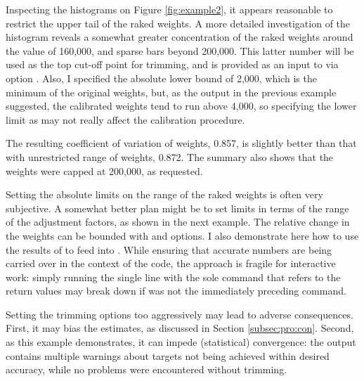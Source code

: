 \begin{stexample}[Example 3]

Inspecting the histograms on Figure \ref{fig:example2}, it appears reasonable
to restrict the upper tail of the raked weights. A more detailed investigation
of the histogram reveals a somewhat greater concentration of the raked weights
around the value of 160,000, and sparse bars beyond 200,000. This latter number
will be used as the top cut-off point for trimming, and is provided as an input
to  via option . Also, I specified the absolute
lower bound of 2,000, which is the minimum of the original weights, but,
as the output in the previous example suggested, the calibrated weights tend to run
above 4,000, so specifying the lower limit as  may not really
affect the calibration procedure.

\begin{stlog}
\nullskip
\end{stlog}

The resulting coefficient of variation of weights, 0.857, is slightly
better than that with unrestricted range of weights, 0.872. The summary also shows
that the weights were capped at 200,000, as requested.

Setting the absolute limits on the range of the raked weights is often
very subjective. A somewhat better plan might be to set limits in terms
of the range of the adjustment factors, as shown in the next example. The relative
change in the weights can be bounded with  and 
options.
I also demonstrate here how to use the results of  to feed
into . While ensuring that accurate numbers are being carried
over in the context of the code, the approach is fragile for interactive
work: simply running the single line with the sole
 command that refers to the  return values
may break down if  was not the
immediately preceding command.

\begin{stlog}
\nullskip
\end{stlog}

\end{stexample}

Setting the trimming options too aggressively may lead to adverse
consequences. First, it may bias the estimates, as discussed in Section
\ref{subsec:pro:con}.
Second, as this example demonstrates, it can impede (statistical) convergence:
the output contains multiple warnings about targets not being achieved
within desired accuracy, while no problems were encountered without trimming.

